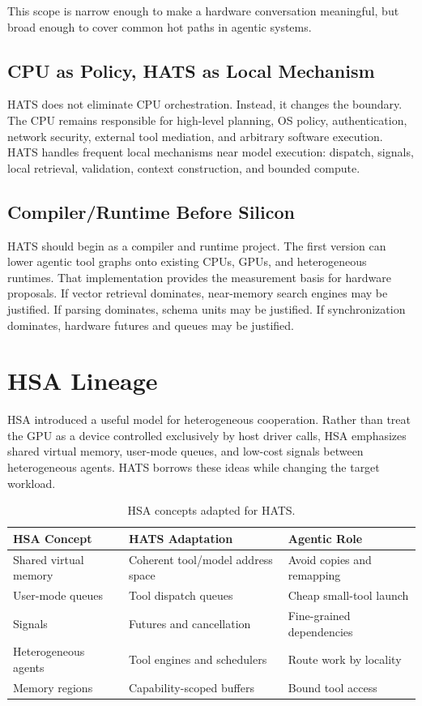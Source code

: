 \documentclass[11pt]{article}
\begin{document}
This scope is narrow enough to make a hardware conversation meaningful, but
broad enough to cover common hot paths in agentic systems.

\subsection{CPU as Policy, HATS as Local Mechanism}

HATS does not eliminate CPU orchestration. Instead, it changes the boundary.
The CPU remains responsible for high-level planning, OS policy, authentication,
network security, external tool mediation, and arbitrary software execution.
HATS handles frequent local mechanisms near model execution: dispatch, signals,
local retrieval, validation, context construction, and bounded compute.

\subsection{Compiler/Runtime Before Silicon}

HATS should begin as a compiler and runtime project. The first version can lower
agentic tool graphs onto existing CPUs, GPUs, and heterogeneous runtimes. That
implementation provides the measurement basis for hardware proposals. If vector
retrieval dominates, near-memory search engines may be justified. If parsing
dominates, schema units may be justified. If synchronization dominates,
hardware futures and queues may be justified.

\section{HSA Lineage}

HSA introduced a useful model for heterogeneous cooperation. Rather than treat
the GPU as a device controlled exclusively by host driver calls, HSA emphasizes
shared virtual memory, user-mode queues, and low-cost signals between heterogeneous
agents. HATS borrows these ideas while changing the target workload.

\begin{table}[h]
\centering
\begin{tabular}{lll}
\toprule
\textbf{HSA Concept} & \textbf{HATS Adaptation} & \textbf{Agentic Role} \\
\midrule
Shared virtual memory & Coherent tool/model address space & Avoid copies and remapping \\
User-mode queues & Tool dispatch queues & Cheap small-tool launch \\
Signals & Futures and cancellation & Fine-grained dependencies \\
Heterogeneous agents & Tool engines and schedulers & Route work by locality \\
Memory regions & Capability-scoped buffers & Bound tool access \\
\bottomrule
\end{tabular}
\caption{HSA concepts adapted for HATS.}
\end{table}
\end{document}
